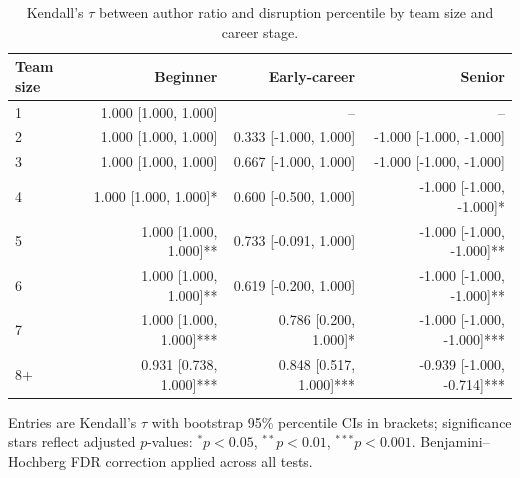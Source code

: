 \begin{table}\centering
\caption{Kendall’s $\tau$ between author ratio and disruption percentile by team size and career stage.}
\begin{tabular}{lrrr}
Team size & Beginner & Early-career & Senior \\
\midrule
1 & 1.000 [1.000, 1.000] & -- & -- \\
2 & 1.000 [1.000, 1.000] & 0.333 [-1.000, 1.000] & -1.000 [-1.000, -1.000] \\
3 & 1.000 [1.000, 1.000] & 0.667 [-1.000, 1.000] & -1.000 [-1.000, -1.000] \\
4 & 1.000 [1.000, 1.000]* & 0.600 [-0.500, 1.000] & -1.000 [-1.000, -1.000]* \\
5 & 1.000 [1.000, 1.000]** & 0.733 [-0.091, 1.000] & -1.000 [-1.000, -1.000]** \\
6 & 1.000 [1.000, 1.000]** & 0.619 [-0.200, 1.000] & -1.000 [-1.000, -1.000]** \\
7 & 1.000 [1.000, 1.000]*** & 0.786 [0.200, 1.000]* & -1.000 [-1.000, -1.000]*** \\
8+ & 0.931 [0.738, 1.000]*** & 0.848 [0.517, 1.000]*** & -0.939 [-1.000, -0.714]*** \\
\bottomrule
\end{tabular}
\vspace{0.25em}
\footnotesize{Entries are Kendall's $\tau$ with bootstrap 95\% percentile CIs in brackets; significance stars reflect adjusted $p$-values: $^{*}p<0.05$, $^{**}p<0.01$, $^{***}p<0.001$. Benjamini–Hochberg FDR correction applied across all tests.}
\end{table}